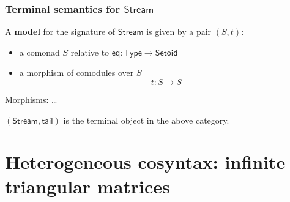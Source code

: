 \documentclass[
]
{beamer}
\newcommand{\constfont}[1]{\ensuremath{\mathsf{#1}}}
\newcommand{\stream}{\constfont{Stream}}
\newcommand{\stail}{\constfont{tail}}
\newcommand{\Setoid}{\constfont{Setoid}}
\newcommand{\eq}{\ensuremath{\mathsf{eq}}}
\newcommand{\Set}{\constfont{Type}}
\newcommand{\fat}[1]{\textbf{#1}}
\begin{document}
\begin{frame}
 \frametitle{Terminal semantics for $\stream$}
 
  \begin{definition}
    A \fat{model} for the signature of $\stream$ is given by a pair $(S,t)$:
    \begin{itemize}
     \item a comonad $S$ relative to $\eq: \Set \to \Setoid$
     \item a morphism of comodules over $S$
        \[  t : S \to S \]
    \end{itemize}
   Morphisms: \ldots
  \end{definition}

 \begin{lemma}
  $(\stream,\stail)$ is the terminal object in the above category.
 \end{lemma}
  
\end{frame}


\section{Heterogeneous cosyntax: infinite triangular matrices}
\end{document}
